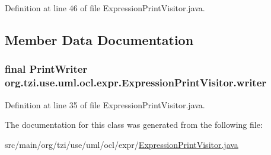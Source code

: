 Definition at line 46 of file Expression\-Print\-Visitor.\-java.



\subsection{Member Data Documentation}
\hypertarget{classorg_1_1tzi_1_1use_1_1uml_1_1ocl_1_1expr_1_1_expression_print_visitor_a1a56f96b52f112ace288e8fcf3e62a34}{
\subsubsection[{writer}]{\setlength{\rightskip}{0pt plus 5cm}final Print\-Writer org.\-tzi.\-use.\-uml.\-ocl.\-expr.\-Expression\-Print\-Visitor.\-writer\hspace{0.3cm}{\ttfamily [protected]}}}\label{classorg_1_1tzi_1_1use_1_1uml_1_1ocl_1_1expr_1_1_expression_print_visitor_a1a56f96b52f112ace288e8fcf3e62a34}


Definition at line 35 of file Expression\-Print\-Visitor.\-java.



The documentation for this class was generated from the following file\-:\begin{DoxyCompactItemize}
\item 
src/main/org/tzi/use/uml/ocl/expr/\hyperlink{_expression_print_visitor_8java}{Expression\-Print\-Visitor.\-java}\end{DoxyCompactItemize}
